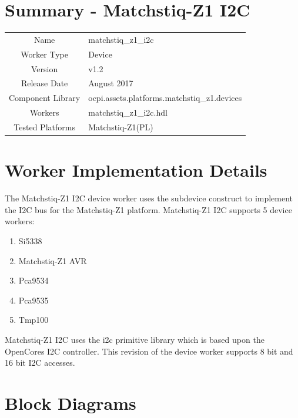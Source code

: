 \documentclass{article}
\author{} %
\date{Version \docVersion} %
\title{\docTitle}
\def\docVersion{1.2}
\def\comp{matchstiq\_z1\_i2c}
\def\Comp{Matchstiq-Z1 I2C}
\begin{document}
\section*{Summary - \Comp}
\begin{tabular}{|c|M{13.5cm}|}
	\hline
	                  &                                        \\
	\hline
	Name              & \comp                                  \\
	\hline
	Worker Type       & Device                                 \\
	\hline
	Version           & v\docVersion \\
	\hline
	Release Date      & August 2017 \\
	\hline
	Component Library & ocpi.assets.platforms.matchstiq\_z1.devices \\
	\hline
	Workers           & \comp.hdl                              \\
	\hline
	Tested Platforms  & Matchstiq-Z1(PL)                       \\
	\hline
\end{tabular}

\section*{Worker Implementation Details}
The Matchstiq-Z1 I2C device worker uses the subdevice construct to implement the I2C bus for the Matchstiq-Z1 platform. Matchstiq-Z1 I2C supports 5 device workers:
\begin{enumerate}
	\item Si5338
	\item Matchstiq-Z1 AVR
	\item Pca9534
	\item Pca9535
	\item Tmp100
\end{enumerate}
Matchstiq-Z1 I2C uses the i2c primitive library which is based upon the OpenCores I2C controller. This revision of the device worker supports 8 bit and 16 bit I2C accesses.

\section*{Block Diagrams}
\end{document}
